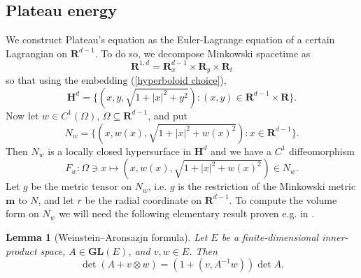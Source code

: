 \documentclass[reqno,10pt]{amsart}
\newcommand{\RR}{\mathbf{R}}
\newcommand{\Hyp}{\mathbf H}
\newcommand{\GL}{\mathbf{GL}}
\newcommand{\Mink}{\mathbf m}
\newtheorem{lemma}[theorem]{Lemma}
\theoremstyle{definition}
\numberwithin{equation}{section}
\begin{document}
\subsection{Plateau energy}
We construct Plateau's equation as the Euler-Lagrange equation of a certain Lagrangian on $\RR^{d - 1}$.
To do so, we decompose Minkowski spacetime as 
$$\RR^{1, d} = \RR^{d - 1}_x \times \RR_y \times \RR_t$$
so that using the embedding (\ref{hyperboloid choice}),
$$\Hyp^d = \{(x, y, \sqrt{1 + |x|^2 + y^2}): (x, y) \in \RR^{d - 1} \times \RR\}.$$
Now let $w \in C^1(\Omega)$, $\Omega \subseteq \RR^{d - 1}$, and put 
$$N_w = \{(x, w(x), \sqrt{1 + |x|^2 + w(x)^2}): x \in \RR^{d - 1}\}.$$
Then $N_w$ is a locally closed hypersurface in $\Hyp^d$ and we have a $C^1$ diffeomorphism
$$F_w: \Omega \ni x \mapsto (x, w(x), \sqrt{1 + |x|^2 + w(x)^2}) \in N_w.$$
Let $g$ be the metric tensor on $N_w$, i.e. $g$ is the restriction of the Minkowski metric $\Mink$ to $N$, and let $r$ be the radial coordinate on $\RR^{d - 1}$.
To compute the volume form on $N_w$ we will need the following elementary result proven e.g. in \cite{Tao13}.

\begin{lemma}[Weinstein--Aronsazjn formula]
Let $E$ be a finite-dimensional inner-product space, $A \in \GL(E)$, and $v, w \in E$. Then
\begin{equation}\label{WeinsteinAronsazjn}
\det(A + v \otimes w) = (1 + (v, A^{-1} w)) \det A.
\end{equation}
\end{lemma}
\end{document}
